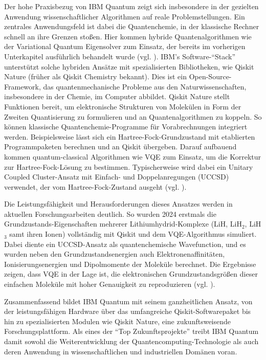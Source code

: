 Der hohe Praxisbezug von IBM Quantum zeigt sich insbesondere in der gezielten Anwendung wissenschaftlicher Algorithmen auf reale Problemstellungen. Ein zentrales Anwendungsfeld ist dabei die Quantenchemie, in der klassische Rechner schnell an ihre Grenzen stoßen. Hier kommen hybride Quantenalgorithmen wie der Variational Quantum Eigensolver zum Einsatz, der bereits im vorherigen Unterkapitel ausführlich behandelt wurde (vgl.  \cite{miceliQuantumComputationVisualization2018}). IBM’s Software-“Stack” unterstützt solche hybriden Ansätze mit spezialisierten Bibliotheken, wie Qiskit Nature (früher als Qiskit Chemistry bekannt). Dies ist ein Open-Source-Framework, das quantenmechanische Probleme aus den Naturwissenschaften, insbesondere in der Chemie, im Computer abbildet. Qiskit Nature stellt Funktionen bereit, um elektronische Strukturen von Molekülen in Form der Zweiten Quantisierung zu formulieren und an Quantenalgorithmen zu koppeln. So können klassische Quantenchemie-Programme für Vorabrechnungen integriert werden. Beispielsweise lässt sich ein Hartree-Fock-Grundzustand mit etablierten Programmpaketen berechnen und an Qiskit übergeben. Darauf aufbauend kommen quantum-classical Algorithmen wie VQE zum Einsatz, um die Korrektur zur Hartree-Fock-Lösung zu bestimmen. Typischerweise wird dabei ein Unitary Coupled Cluster-Ansatz mit Einfach- und Doppelanregungen (UCCSD) verwendet, der vom Hartree-Fock-Zustand ausgeht (vgl. \cite{avramidisGroundStateProperty2024}).

Die Leistungsfähigkeit und Herausforderungen dieses Ansatzes werden in aktuellen Forschungsarbeiten deutlich. So wurden 2024 erstmals die Grundzustands-Eigenschaften mehrerer Lithiumhydrid-Komplexe (LiH, LiH$_2$, LiH$_3$ samt ihren Ionen) vollständig mit Qiskit und dem VQE-Algorithmus simuliert. Dabei diente ein UCCSD-Ansatz als quantenchemische Wavefunction, und es wurden neben den Grundzustandsenergien auch Elektronenaffinitäten, Ionisierungsenergien und Dipolmomente der Moleküle berechnet. Die Ergebnisse zeigen, dass VQE in der Lage ist, die elektronischen Grundzustandsgrößen dieser einfachen Moleküle mit hoher Genauigkeit zu reproduzieren (vgl. \cite{avramidisGroundStateProperty2024}).

Zusammenfassend bildet IBM Quantum mit seinem ganzheitlichen Ansatz, von der leistungsfähigen Hardware über das umfangreiche Qiskit-Softwarepaket bis hin zu spezialisierten Modulen wie Qiskit Nature, eine zukunftsweisende Forschungsplattform. Als eines der “Top Zukunftsprojekte” treibt IBM Quantum damit sowohl die Weiterentwicklung der Quantencomputing-Technologie als auch deren Anwendung in wissenschaftlichen und industriellen Domänen voran.

